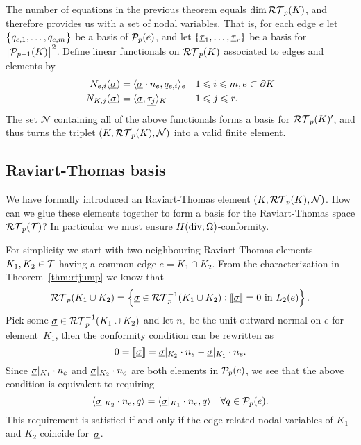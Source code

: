 \documentclass[thesis.tex]{subfiles}
\begin{document}
The number of equations in the previous theorem equals $\dim{\RT_p(K)}$, and therefore provides us with a
set of nodal variables. That is, for each edge $e$ let $\set{q_{e,1},\dots, q_{e,m}}$ be a basis of $\P_p(e)$, and let
 $\set{\vtau_1, \dots, \vtau_r}$ be a  basis for $\left[\P_{p-1}(K)\right]^2$. 
 Define linear functionals on $\RT_p(K)$ associated to edges and elements by
\begin{equation}
  \label{eq:nodalrt}
  \begin{alignedat}{2}
    N_{e,i}(\vsig) &= \ip{\vsig \cdot n_e, q_{e,i}}_e && \quad 1 \leq i \leq m,  e \subset \partial K\\
    N_{K,j}(\vsig) &= \ip{\vsig, \v{\tau_j}}_K &&\quad 1 \leq j \leq r.
  \end{alignedat}
\end{equation}
The set $\mathcal{N}$ containing all of the above functionals forms a basis for $\RT_p(K)'$, and thus
turns the triplet $(K, \RT_p(K), \mathcal{N})$ into a valid finite element.

\subsection{Raviart-Thomas basis}
We have formally introduced an Raviart-Thomas element $(K, \RT_p(K), \mathcal{N})$. How can we glue these elements
together to form a basis for the Raviart-Thomas space $\RT_p(\T)$? In particular we must ensure $H(\div; \O)$-conformity.

For simplicity we start with two neighbouring Raviart-Thomas elements $K_1, K_2 \in  \T$ having a common edge $e = K_1 \cap K_2$.
From the characterization in Theorem~\ref{thm:rtjump} we know that
\[
\RT_p(K_1 \cup K_2) = \set{\vsig \in \RT_p^{-1}(K_1 \cup K_2) : \llbracket \vsig \rrbracket = 0 \text{ in } L_2(e)}.
\]
Pick some $\vsig \in \RT_p^{-1}(K_1 \cup K_2)$ and let $n_e$ be the unit outward normal on $e$ for element~$K_1$,
then the conformity condition can be rewritten as
\[
  0 = \llbracket \vsig \rrbracket  = \vsig|_{K_2} \cdot  n_e - \vsig|_{K_1} \cdot n_e.
\]
Since $\vsig|_{K_1} \cdot n_{e}$ and $\vsig|_{K_2} \cdot n_{e}$ are both elements in $\P_p(e)$, we see that 
the  above condition is equivalent to requiring
\[
  \ip{\vsig|_{K_2} \cdot n_e, q} = \ip{\vsig|_{K_1} \cdot n_e, q} \quad \forall q \in \P_p(e).
\]
This requirement is satisfied  if and only if the edge-related nodal variables of $K_1$ and $K_2$ coincide for~$\vsig$.
\end{document}
